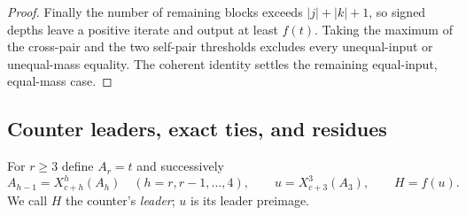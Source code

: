 \begin{proof}
Finally the number of remaining blocks exceeds $|j|+|k|+1$, so signed
depths leave a positive iterate and output at least $f(t)$. Taking the
maximum of the cross-pair and the two self-pair thresholds excludes every
unequal-input or unequal-mass equality. The coherent identity settles the
remaining equal-input, equal-mass case.
\end{proof}

\subsection{Counter leaders, exact ties, and residues}
For $r\ge3$ define $A_r=t$ and successively
\[
 A_{h-1}=X^h_{c+h}(A_h)\quad(h=r,r-1,\ldots,4),\qquad
 u=X^3_{c+3}(A_3),\qquad H=f(u).
\]
We call $H$ the counter's \emph{leader}; $u$ is its leader preimage.

